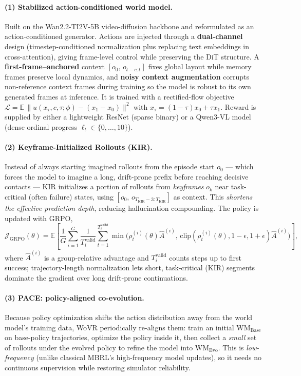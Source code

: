 \documentclass[11pt]{article}
\begin{document}
\paragraph{(1) Stabilized action-conditioned world model.} Built on the Wan2.2-TI2V-5B video-diffusion
backbone and reformulated as an action-conditioned generator. Actions are injected through a
\textbf{dual-channel} design (timestep-conditioned normalization plus replacing text embeddings in
cross-attention), giving frame-level control while preserving the DiT structure. A
\textbf{first-frame--anchored} context $[o_0,\,o_{t-c:t}]$ fixes global layout while memory frames
preserve local dynamics, and \textbf{noisy context augmentation} corrupts non-reference context frames
during training so the model is robust to its own generated frames at inference. It is trained with a
rectified-flow objective $\mathcal{L}=\mathbb{E}\,\lVert u(x_\tau,c,\tau;\phi)-(x_1-x_0)\rVert^2$ with
$x_\tau=(1-\tau)x_0+\tau x_1$. Reward is supplied by either a lightweight ResNet (sparse binary) or a
Qwen3-VL model (dense ordinal progress $\ell_t\in\{0,\dots,10\}$).

\paragraph{(2) Keyframe-Initialized Rollouts (KIR).} Instead of always starting imagined rollouts from
the episode start $o_0$ --- which forces the model to imagine a long, drift-prone prefix before reaching
decisive contacts --- KIR initializes a portion of rollouts from \emph{keyframes} $o_k$ near
task-critical (often failure) states, using $[o_0,\,o_{T_{\mathrm{KIR}}-3:T_{\mathrm{KIR}}}]$ as context.
This \emph{shortens the effective prediction depth}, reducing hallucination compounding. The policy is
updated with GRPO,
\begin{equation}
\mathcal{J}_{\mathrm{GRPO}}(\theta)=\mathbb{E}\!\left[\frac{1}{G}\sum_{i=1}^{G}\frac{1}{T^{\mathrm{valid}}_i}\sum_{t=1}^{T^{\mathrm{valid}}_i}\min\!\big(\rho^{(i)}_t(\theta)\hat A^{(i)},\,\mathrm{clip}(\rho^{(i)}_t(\theta),1-\epsilon,1+\epsilon)\hat A^{(i)}\big)\right],
\end{equation}
where $\hat A^{(i)}$ is a group-relative advantage and $T^{\mathrm{valid}}_i$ counts steps up to first
success; trajectory-length normalization lets short, task-critical (KIR) segments dominate the gradient
over long drift-prone continuations.

\paragraph{(3) PACE: policy-aligned co-evolution.} Because policy optimization shifts the action
distribution away from the world model's training data, WoVR periodically re-aligns them: train an
initial $\mathrm{WM}_{\mathrm{Base}}$ on base-policy trajectories, optimize the policy inside it, then
collect a \emph{small} set of rollouts under the evolved policy to refine the model into
$\mathrm{WM}_{\mathrm{Evo}}$. This is \emph{low-frequency} (unlike classical MBRL's high-frequency model
updates), so it needs no continuous supervision while restoring simulator reliability.
\end{document}
